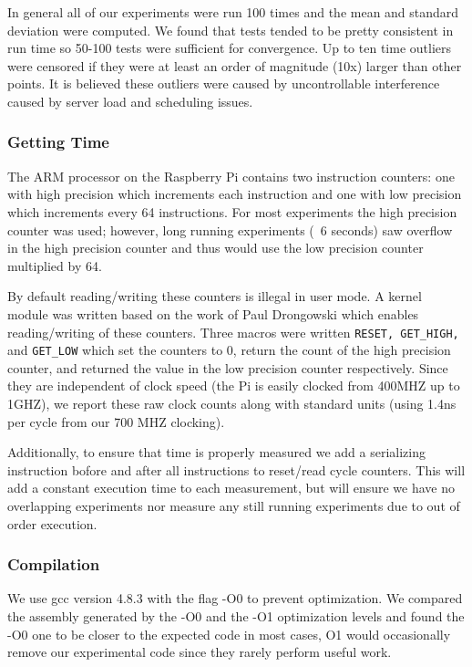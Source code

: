 In general all of our experiments were run 100 times and the mean and standard deviation were computed.
We found that tests tended to be pretty consistent in run time so 50-100 tests were sufficient for convergence.
Up to ten time outliers were censored if they were at least an order of magnitude (10x) larger than other points.  
It is believed these outliers were caused by uncontrollable interference caused by server load and scheduling issues.

\subsubsection{Getting Time}
The ARM processor on the Raspberry Pi contains two instruction counters: one with high precision which increments each instruction and one with low precision which increments every 64 instructions.
For most experiments the high precision counter was used; however, long running experiments (~6 seconds) saw overflow in the high precision counter and thus would use the low precision counter multiplied by 64.  

By default reading/writing these counters is illegal in user mode. 
A kernel module was written based on the work of Paul Drongowski\cite{sand} which enables reading/writing of these counters.
Three macros were written {\tt RESET, GET\_HIGH,} and {\tt GET\_LOW} which set the counters to 0, return the count of the high precision counter, and returned the value in the low precision counter respectively.
Since they are independent of clock speed (the Pi is easily clocked from 400MHZ up to 1GHZ), we report these raw clock counts along with standard units (using 1.4ns per cycle from our 700 MHZ clocking).

Additionally, to ensure that time is properly measured we add a serializing instruction bofore and after all instructions to reset/read cycle counters.
This will add a constant execution time to each measurement, but will ensure we have no overlapping experiments nor measure any still running experiments due to out of order execution.


\subsubsection{Compilation}
We use gcc version 4.8.3 with the flag -O0 to prevent optimization.
We compared the assembly generated by the -O0 and the -O1 optimization levels and found the -O0 one to be closer to the expected code in most cases, O1 would occasionally remove our experimental code since they rarely perform useful work.